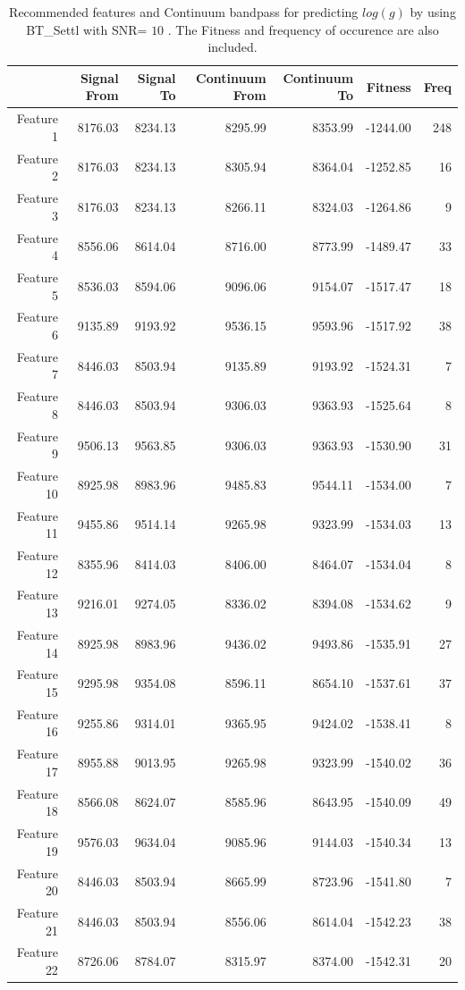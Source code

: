 {{\begin{table}
\begin{center}
\begin{tabular}{rrrrrrr}
  \hline
 & Signal From & Signal To & Continuum From & Continuum To & Fitness & Freq \\ 
  \hline
Feature 1 & 8176.03 & 8234.13 & 8295.99 & 8353.99 & -1244.00 & 248 \\ 
  Feature 2 & 8176.03 & 8234.13 & 8305.94 & 8364.04 & -1252.85 &  16 \\ 
  Feature 3 & 8176.03 & 8234.13 & 8266.11 & 8324.03 & -1264.86 &   9 \\ 
  Feature 4 & 8556.06 & 8614.04 & 8716.00 & 8773.99 & -1489.47 &  33 \\ 
  Feature 5 & 8536.03 & 8594.06 & 9096.06 & 9154.07 & -1517.47 &  18 \\ 
  Feature 6 & 9135.89 & 9193.92 & 9536.15 & 9593.96 & -1517.92 &  38 \\ 
  Feature 7 & 8446.03 & 8503.94 & 9135.89 & 9193.92 & -1524.31 &   7 \\ 
  Feature 8 & 8446.03 & 8503.94 & 9306.03 & 9363.93 & -1525.64 &   8 \\ 
  Feature 9 & 9506.13 & 9563.85 & 9306.03 & 9363.93 & -1530.90 &  31 \\ 
  Feature 10 & 8925.98 & 8983.96 & 9485.83 & 9544.11 & -1534.00 &   7 \\ 
  Feature 11 & 9455.86 & 9514.14 & 9265.98 & 9323.99 & -1534.03 &  13 \\ 
  Feature 12 & 8355.96 & 8414.03 & 8406.00 & 8464.07 & -1534.04 &   8 \\ 
  Feature 13 & 9216.01 & 9274.05 & 8336.02 & 8394.08 & -1534.62 &   9 \\ 
  Feature 14 & 8925.98 & 8983.96 & 9436.02 & 9493.86 & -1535.91 &  27 \\ 
  Feature 15 & 9295.98 & 9354.08 & 8596.11 & 8654.10 & -1537.61 &  37 \\ 
  Feature 16 & 9255.86 & 9314.01 & 9365.95 & 9424.02 & -1538.41 &   8 \\ 
  Feature 17 & 8955.88 & 9013.95 & 9265.98 & 9323.99 & -1540.02 &  36 \\ 
  Feature 18 & 8566.08 & 8624.07 & 8585.96 & 8643.95 & -1540.09 &  49 \\ 
  Feature 19 & 9576.03 & 9634.04 & 9085.96 & 9144.03 & -1540.34 &  13 \\ 
  Feature 20 & 8446.03 & 8503.94 & 8665.99 & 8723.96 & -1541.80 &   7 \\ 
  Feature 21 & 8446.03 & 8503.94 & 8556.06 & 8614.04 & -1542.23 &  38 \\ 
  Feature 22 & 8726.06 & 8784.07 & 8315.97 & 8374.00 & -1542.31 &  20 \\ 
   \hline
\end{tabular}
\caption {Recommended features and Continuum bandpass for predicting $log(g)$ 
      by using BT\_Settl with SNR= $ 10 $ . 
      The Fitness and frequency of occurence are also included.} \label{tab:tab_SNR10_G} 
\end{center}
\end{table}

}}
